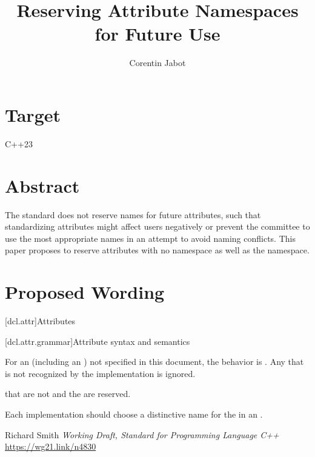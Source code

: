 \documentclass{wg21}
\title{Reserving Attribute Namespaces for Future Use}
\author{Corentin Jabot}{corentin.jabot@gmail.com}
\begin{document}
\maketitle

\section{Target}

C++23

\section{Abstract}

The standard does not reserve names for future attributes, such that standardizing attributes might affect users negatively
or prevent the committee to use the most appropriate names in an attempt to avoid naming conflicts.
This paper proposes to reserve attributes with no namespace as well as the  namespace.

\section{Proposed Wording}

[dcl.attr]{Attributes}%

[dcl.attr.grammar]{Attribute syntax and semantics}

\pnum
For an 
(including an )
not specified in this document, the
behavior is .
Any  that is not recognized by the implementation
is ignored.

\begin{addedblock}
 that are not  and the  
are reserved.
\end{addedblock}


\begin{note}
	Each implementation should choose a distinctive name for the
	 in an .
\end{note}


 
\begin{thebibliography}{9}
    
    Richard Smith
    \emph{Working Draft, Standard for Programming Language C++}\newline
    \url{https://wg21.link/n4830}
    
\end{thebibliography}
\end{document}
